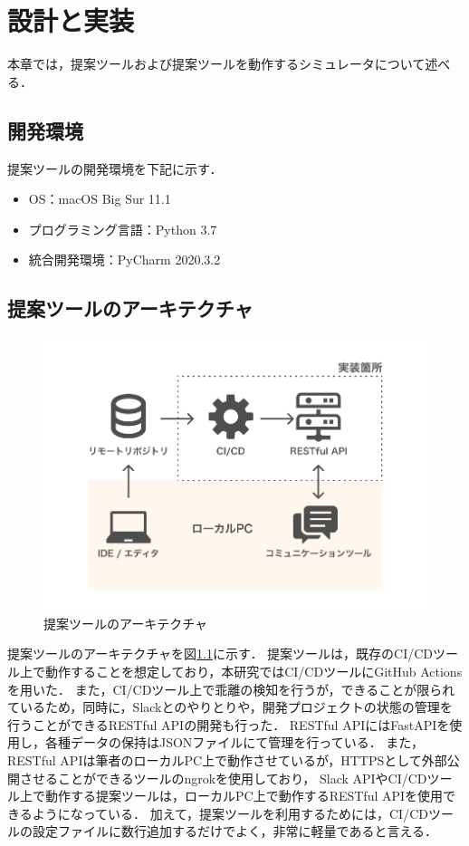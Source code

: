 \chapter{設計と実装}
本章では，提案ツールおよび提案ツールを動作するシミュレータについて述べる．

\section{開発環境}
提案ツールの開発環境を下記に示す．

\begin{itemize}
    \item OS：macOS Big Sur 11.1
    \item プログラミング言語：Python 3.7
    \item 統合開発環境：PyCharm 2020.3.2
\end{itemize}

\section{提案ツールのアーキテクチャ}
\label{toolartchitecture}

\begin{figure}[H]
    \centering
    \includegraphics[width=12cm]{images/architecture.png}
    \caption{提案ツールのアーキテクチャ}
    \label{architecture}
\end{figure}

提案ツールのアーキテクチャを図\ref{architecture}に示す．
提案ツールは，既存のCI/CDツール上で動作することを想定しており，本研究ではCI/CDツールにGitHub Actions\cite{actions}を用いた．
また，CI/CDツール上で乖離の検知を行うが，できることが限られているため，同時に，Slackとのやりとりや，開発プロジェクトの状態の管理を行うことができるRESTful APIの開発も行った．
RESTful APIにはFastAPIを使用し，各種データの保持はJSONファイルにて管理を行っている．
また，RESTful APIは筆者のローカルPC上で動作させているが，HTTPSとして外部公開させることができるツールのngrok\cite{ngrok}を使用しており，
Slack APIやCI/CDツール上で動作する提案ツールは，ローカルPC上で動作するRESTful APIを使用できるようになっている．
加えて，提案ツールを利用するためには，CI/CDツールの設定ファイルに数行追加するだけでよく，非常に軽量であると言える．

